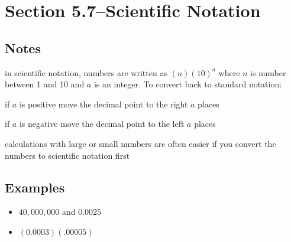 \documentclass[fleqn,addpoints]{exam}
\begin{document}
\section{Section 5.7--Scientific Notation}

\subsection{Notes}
\begin{itemize*}
  \item in scientific notation, numbers are written as $(n)(10)^a$ where $n$ is number between 1 and 10 and $a$ is an integer.  To convert
    back to standard notation:
    \begin{itemize*}
        \item if $a$ is positive move the decimal point to the right $a$ places
        \item if $a$ is negative move the decimal point to the left $a$ places
    \end{itemize*}
  \item calculations with large or small numbers are often easier if you convert the numbers to scientific notation first
\end{itemize*}

\subsection{Examples}
\begin{itemize}
  \item \( 40,000,000\) and \( 0.0025 \) 
  \item \( (0.0003)(.00005) \) 
\end{itemize}
\end{document}
